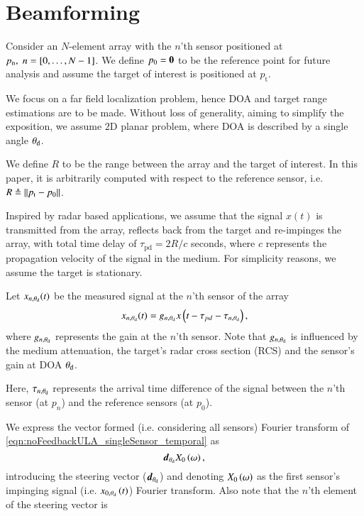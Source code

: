 \section{Beamforming}\label{sec:setup}
Consider an $N$-element array with the $n$'th sensor positioned at $p_{\text{n}},\; n=\left[{0,\ldots,N-1}\right]$. We define $p_{0}=\boldsymbol{0}$ to be the reference point for future analysis and assume the target of interest is positioned at $p_{\text{t}}$.
\par We focus on a far field localization problem, hence DOA and target range estimations are to be made. Without loss of generality, aiming to simplify the exposition, we assume $2\text{D}$ planar problem, where DOA is described by a single angle $\theta_{\text{d}}$. 
\par We define $R$ to be the range between the array and the target of interest. In this paper, it is arbitrarily computed with respect to the reference sensor, i.e. $R\triangleq\left\Vert p_{\text{t}}-p_{0}\right\Vert$.
\par Inspired by radar based applications, we assume that the signal $x(t)$ is transmitted from the array, reflects back from the target and re-impinges the array, with total time delay of $\tau_{\text{pd}}=2R/c$ seconds, where $c$ represents the propagation velocity of the signal in the medium. For simplicity reasons, we assume the target is stationary.
\par Let $x_{n,\theta_{\text{d}}}(t)$ be the measured signal at the $n$'th sensor of the array
\begin{equation}
x_{n,\thetaD}(t) = g_{n,\thetaD}x\Brack{t-\tau_{pd}-\tau_{n,\thetaD}},
\label{eqn:noFeedbackULA_singleSensor_temporal}
\end{equation}
where $g_{n,\theta_{\text{d}}}$ represents the gain at the $n$'th sensor. Note that $g_{n,\theta_{\text{d}}}$ is influenced by the medium attenuation, the target's radar cross section (RCS) and the sensor's gain at DOA $\theta_{\text{d}}$. 
\par Here, $\tau_{n,\theta_{\text{d}}}$ represents the arrival time difference of the signal between the $n$'th sensor (at $p_{n}$) and the reference sensors (at $p_{0}$). 
\par We express the vector formed (i.e. considering all sensors) Fourier transform of \eqref{eqn:noFeedbackULA_singleSensor_temporal} as
\[
\Steer{\thetaD}\F{x}_{0}\rBrace{\omega},
\]
introducing the steering vector ($\boldsymbol{d}_{\theta_{\text{d}}}$) and denoting $\F{x}_{0}\rBrace{\omega}$ as the first sensor's impinging signal (i.e. $x_{0,\theta_{\text{d}}}\left({t}\right)$) Fourier transform. Also note that the $n$'th element of the steering vector is
